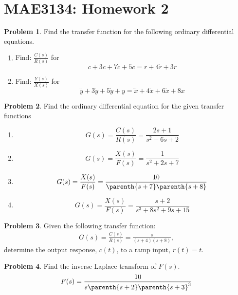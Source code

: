 \documentclass[10pt]{article}
\date{}
\theoremstyle{definition}
\newtheorem{prob}{Problem}[section]
\newenvironment{subprob}%
{\renewcommand{\theenumi}{\alph{enumi}}\renewcommand{\labelenumi}{(\theenumi)}\begin{enumerate}}%
{\end{enumerate}}%
\begin{document}
\pagestyle{empty}
\section*{MAE3134: Homework 2}
\vspace*{-0.4cm}


\begin{prob}
    Find the transfer function for the following ordinary differential equations.
    \begin{subprob}
    \item Find: \( \frac{C(s)}{R(s)}\) for \[ \dddot{c} + 3 \ddot{c} + 7 \dot{c} + 5 c = \ddot{r} + 4 \dot{r} + 3 r \] 
    \item Find: \( \frac{Y(s)}{X(s)}\) for \[ \dddot{y} + 3 \ddot{y} + 5 \dot{y} + y = \dddot{x} + 4 \ddot{x} + 6 \dot{x} + 8 x\] 
    \end{subprob}
\end{prob}

\begin{prob}
    Find the ordinary differential equation for the given transfer functions
    \begin{subprob}
    \item \[ G(s) = \frac{C(s)}{R(s)} = \frac{2 s + 1}{s^2 + 6s + 2} \]
    \item \[ G(s) = \frac{X(s)}{F(s)} = \frac{1}{s^2 + 2s+7} \]
    \item \[ G(s) = \frac{X(s)}{F(s)} = \frac{10}{\parenth{s+7}\parenth{s+8}}\]
    \item \[ G(s) = \frac{X(s)}{F(s)} = \frac{s+2}{s^3 + 8s^2 + 9s+15}\]
    \end{subprob}
\end{prob}

\begin{prob}
    Given the following transfer function:
    \begin{align*}
        G(s) = \frac{C(s)}{R(s)} = \frac{s}{(s +4)(s+8)} ,
    \end{align*}
    determine the output response, \( c(t) \), to a ramp input, \( r(t) = t \).
\end{prob}

\begin{prob}
    Find the inverse Laplace transform of \( F(s)\).
    \begin{align*}
        F(s) = \frac{10}{s \parenth{s+2}\parenth{s+3}^3}
    \end{align*}
\end{prob}
\end{document}
